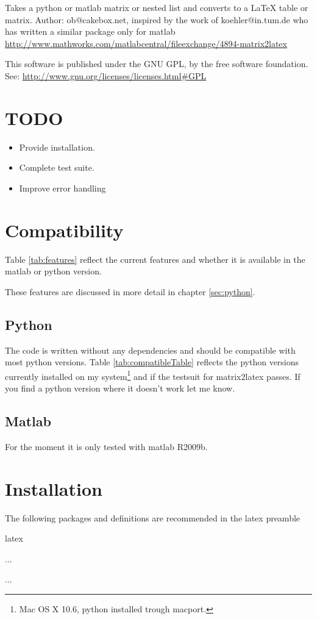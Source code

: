 Takes a python or matlab matrix or nested list and converts to a LaTeX table or matrix.
Author: ob@cakebox.net, inspired by the work of koehler@in.tum.de who has written
a similar package only for matlab
\url{http://www.mathworks.com/matlabcentral/fileexchange/4894-matrix2latex}

This software is published under the GNU GPL, by the free software
foundation. See:
\url{http://www.gnu.org/licenses/licenses.html#GPL}

\section{TODO}
\begin{itemize}
\item Provide installation.
\item Complete test suite.
\item Improve error handling
\end{itemize}

\section{Compatibility}
Table \ref{tab:features} reflect the current features and whether it is available
in the matlab or python version.

These features are discussed in more detail in chapter \ref{sec:python}.

\subsection{Python}
The code is written without any dependencies and should be compatible with most python versions.
Table \ref{tab:compatibleTable} reflects the python versions currently installed
on my system\footnote{Mac OS X 10.6, python installed trough macport.}
and if the testsuit for matrix2latex passes. If you find a python version where
it doesn't work let me know.

\subsection{Matlab}
For the moment it is only tested with matlab R2009b.

\section{Installation}
The following packages and definitions are recommended in the latex preamble 
\begin{pygments}{latex}
\providecommand{\e}[1]{\ensuremath{\times 10^{#1}}}
\usepackage{amsmath} %
\usepackage{booktabs} %
\usepackage{caption} %
...

...
\end{pygments}
